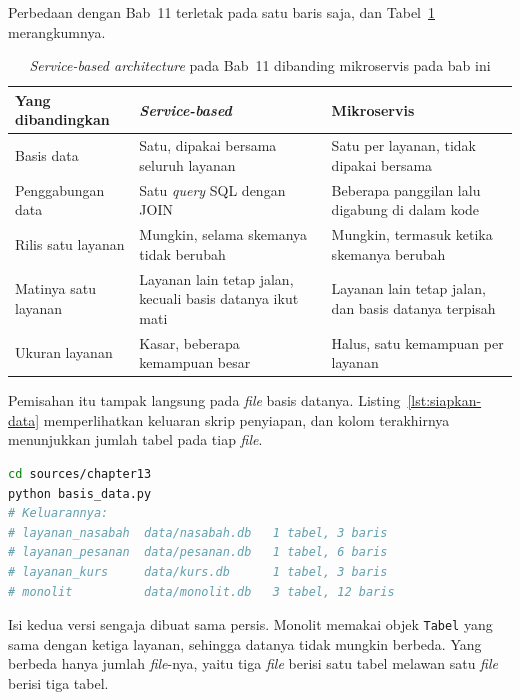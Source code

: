 Perbedaan dengan Bab~11 terletak pada satu baris saja, dan
Tabel~\ref{tab:sba-mikro} merangkumnya.

\begin{table}[htbp]
  \centering
  \caption{\textit{Service-based architecture} pada Bab~11 dibanding mikroservis
    pada bab ini}
  \label{tab:sba-mikro}
  \begin{tabularx}{\textwidth}{|l|X|X|}
    \hline
    \textbf{Yang dibandingkan} & \textbf{\textit{Service-based}} & \textbf{Mikroservis} \\
    \hline
    Basis data & Satu, dipakai bersama seluruh layanan & Satu per layanan, tidak dipakai bersama \\
    \hline
    Penggabungan data & Satu \textit{query} SQL dengan JOIN & Beberapa panggilan lalu digabung di dalam kode \\
    \hline
    Rilis satu layanan & Mungkin, selama skemanya tidak berubah & Mungkin, termasuk ketika skemanya berubah \\
    \hline
    Matinya satu layanan & Layanan lain tetap jalan, kecuali basis datanya ikut mati & Layanan lain tetap jalan, dan basis datanya terpisah \\
    \hline
    Ukuran layanan & Kasar, beberapa kemampuan besar & Halus, satu kemampuan per layanan \\
    \hline
  \end{tabularx}
\end{table}

Pemisahan itu tampak langsung pada \textit{file} basis datanya.
Listing~\ref{lst:siapkan-data} memperlihatkan keluaran skrip penyiapan, dan
kolom terakhirnya menunjukkan jumlah tabel pada tiap \textit{file}.

\begin{lstlisting}[language=bash, caption={Menyiapkan keempat berkas basis data,
  tersedia di \berkas{sources/chapter13/basis_data.py}}, label=lst:siapkan-data]
cd sources/chapter13
python basis_data.py
# Keluarannya:
# layanan_nasabah  data/nasabah.db   1 tabel, 3 baris
# layanan_pesanan  data/pesanan.db   1 tabel, 6 baris
# layanan_kurs     data/kurs.db      1 tabel, 3 baris
# monolit          data/monolit.db   3 tabel, 12 baris
\end{lstlisting}

Isi kedua versi sengaja dibuat sama persis. Monolit memakai objek
\texttt{Tabel} yang sama dengan ketiga layanan, sehingga datanya tidak mungkin
berbeda. Yang berbeda hanya jumlah \textit{file}-nya, yaitu tiga \textit{file} berisi satu
tabel melawan satu \textit{file} berisi tiga tabel.

